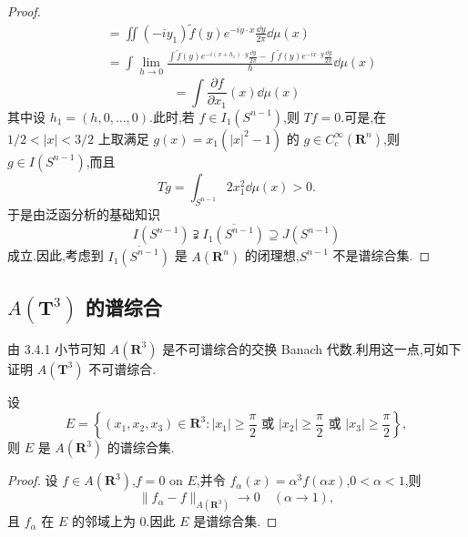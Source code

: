 \begin{proof}
\begin{align*}
&= \iint (-iy_{1})\tilde{f}(y)e^{-iy \cdot x}\frac{\dd y}{2\pi}\dd\mu(x)\\
&= \int \lim_{h \to 0}\frac{\int \tilde{f}(y)e^{-i(x+h_{1})\cdot y}\frac{\dd y}{2\pi} - \int \tilde{f}(y)e^{-ix \cdot y}\frac{\dd y}{2\pi}}{h}\dd\mu(x)
\end{align*}
\begin{equation*}
= \int \frac{\partial f}{\partial x_{1}}(x)\dd\mu(x)
\end{equation*}
其中设 $h_{1} = (h, 0, \ldots, 0)$.此时,若 $f \in I_{1}(S^{n-1})$,则 $Tf = 0$.可是,在 $1/2 < |x| < 3/2$ 上取满足 $g(x) = x_{1}(|x|^{2} - 1)$ 的 $g \in C_{c}^{\infty}(\mathbf{R}^{n})$,则 $g \in I(S^{n-1})$,而且
\begin{equation*}
Tg = \int_{S^{n-1}} 2x_{1}^{2}\dd\mu(x) > 0.
\end{equation*}
于是由泛函分析的基础知识
\begin{equation*}
I(S^{n-1}) \supsetneqq \overline{I_{1}(S^{n-1})} \supseteq J(S^{n-1})
\end{equation*}
成立.因此,考虑到 $\overline{I_{1}(S^{n-1})}$ 是 $A(\mathbf{R}^{n})$ 的闭理想,$S^{n-1}$ 不是谱综合集.
\end{proof}

\subsection{\texorpdfstring{$A(\mathbf{T}^3)$ 的谱综合}{A(T^3) 的谱综合}}\label{sec:3.4.2}

由 3.4.1 小节可知 $A(\mathbf{R}^{3})$ 是不可谱综合的交换 Banach 代数.利用这一点,可如下证明 $A(\mathbf{T}^{3})$ 不可谱综合.

\begin{proposition}\label{prop:3.4.2}
设
\begin{equation*}
E = \left\{(x_{1}, x_{2}, x_{3}) \in \mathbf{R}^{3}: |x_{1}| \geq \frac{\pi}{2} \text{ 或 } |x_{2}| \geq \frac{\pi}{2} \text{ 或 } |x_{3}| \geq \frac{\pi}{2}\right\},
\end{equation*}
则 $E$ 是 $A(\mathbf{R}^{3})$ 的谱综合集.
\end{proposition}

\begin{proof}
设 $f \in A(\mathbf{R}^{3})$,$f = 0$ on $E$,并令 $f_{\alpha}(x) = \alpha^{3}f(\alpha x)$,$0 < \alpha < 1$,则
\begin{equation*}
\|f_{\alpha} - f\|_{A(\mathbf{R}^{3})} \to 0 \quad (\alpha \to 1),
\end{equation*}
且 $f_{\alpha}$ 在 $E$ 的邻域上为 0.因此 $E$ 是谱综合集.
\end{proof}

